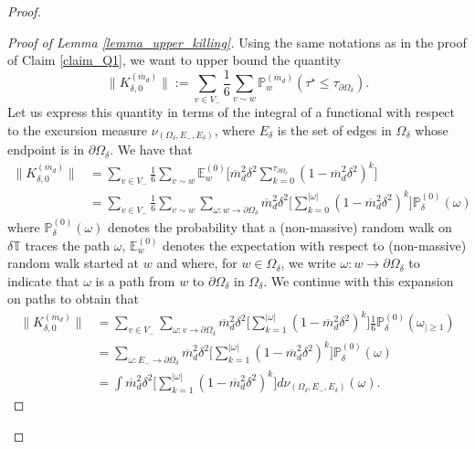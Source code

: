 \documentclass{article}
\newcommand{\PP}{{\mathbb{P}}}
\newcommand{\EE}{{\mathbb{E}}}
\theoremstyle{definition}
\theoremstyle{remark}
\theoremstyle{remark}
\begin{document}
\begin{proof}
\begin{proof}[Proof of Lemma \ref{lemma_upper_killing}]
Using the same notations as in the proof of Claim \ref{claim_Q1}, we want to upper bound the quantity
\begin{equation*}
    \| K_{\delta, 0}^{(\overline{m}_{d})} \| := \sum_{v \in V_{-}} \frac{1}{6} \sum_{v \sim w} \PP_{w}^{(\overline{m}_d)}(\tau^{\star} \leq \tau_{\partial \Omega_{\delta}}).
\end{equation*}
Let us express this quantity in terms of the integral of a functional with respect to the excursion measure $\nu_{(\Omega_{\delta}, E_{-}, E_{\delta})}$, where $E_{\delta}$ is the set of edges in $\Omega_{\delta}$ whose endpoint is in $\partial \Omega_{\delta}$. We have that
\begin{align*}
    \| K_{\delta, 0}^{(\overline{m}_d)} \| &= \sum_{v \in V_{-}} \frac{1}{6} \sum_{v \sim w} \EE_{w}^{(0)} \bigg[ \overline{m}_d^{2}\delta^2 \sum_{k=0}^{\tau_{\partial \Omega_{\delta}}} (1-\overline{m}_d^2\delta^2)^k \bigg] \\
    &= \sum_{v \in V_{-}} \frac{1}{6} \sum_{v \sim w} \sum_{\omega: w \to \partial \Omega_{\delta}} \overline{m}_d^{2}\delta^2 \bigg[ \sum_{k=0}^{\vert \omega \vert } (1-\overline{m}_d^2\delta^2)^k \bigg] \PP_{\delta}^{(0)}(\omega) 
\end{align*}
where $\PP_{\delta}^{(0)}(\omega)$ denotes the probability that a (non-massive) random walk on $\delta \mathbb{T}$ traces the path $\omega$, $\EE_w^{(0)}$ denotes the expectation with respect to (non-massive) random walk started at $w$ and where, for $w \in \Omega_{\delta}$, we write $\omega: w \to \partial \Omega_{\delta}$ to indicate that $\omega$ is a path from $w$ to $\partial \Omega_{\delta}$ in $\Omega_{\delta}$. We continue with this expansion on paths to obtain that
\begin{align*}    
    \| K_{\delta, 0}^{(\overline{m}_d)} \| &= \sum_{v \in V_{-}} \sum_{\omega: v \to \partial \Omega_{\delta}} \overline{m}_d^{2}\delta^2 \bigg[ \sum_{k=1}^{\vert \omega \vert } (1-\overline{m}_d^2\delta^2)^k \bigg] \frac{1}{6}\PP_{\delta}^{(0)}(\omega_{\vert \geq 1}) \\
    &= \sum_{\omega: E_{-} \to \partial \Omega_{\delta}} \overline{m}_d^{2}\delta^2 \bigg[ \sum_{k=1}^{\vert \omega \vert } (1-\overline{m}_d^2\delta^2)^k \bigg] \PP_{\delta}^{(0)}(\omega) \\
    &= \int \overline{m}_d^{2}\delta^2 \bigg[ \sum_{k=1}^{\vert \omega \vert } (1-\overline{m}_d^2\delta^2)^k \bigg] d\nu_{(\Omega_{\delta}, E_{-}, E_{\delta})}(\omega).

\end{align*}
\end{proof}
\end{proof}
\end{document}
